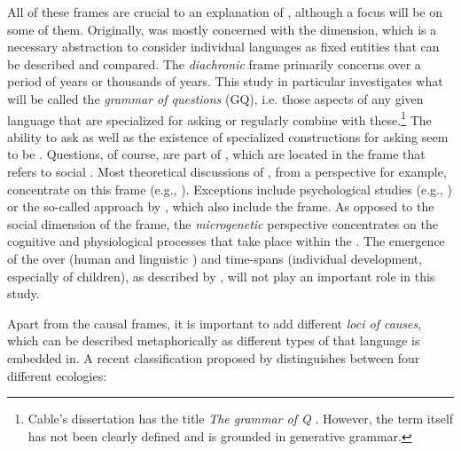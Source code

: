 All of these frames are crucial to an explanation of , although a focus will be on some of them. Originally,   was mostly concerned with the \textit{} dimension, which is a necessary abstraction to consider individual languages as fixed entities that can be described and compared. The \textit{diachronic} frame primarily concerns  over a period of years or thousands of years. This study in particular investigates what will be called the \textit{grammar of questions} (GQ), i.e. those aspects of any given language that are specialized for asking  or regularly combine with these.\footnote{Cable’s dissertation has the title \textit{The grammar of Q} \citep{Cable2007}. However, the term itself has not been clearly defined and is grounded in generative grammar.} The ability to ask  as well as the existence of specialized constructions for asking  seem to be . Questions, of course, are part of , which are located in the \textit{} frame that refers to social . Most theoretical discussions of , from a  perspective for example, concentrate on this frame (e.g., \citealt{Levinson2012b}). Exceptions include psychological studies (e.g., \citealt{Loewenstein1994}) or the so-called \textit{} approach by \citet{Schulze2007}, which also include the  frame. As opposed to the social dimension of the  frame, the \textit{microgenetic} perspective concentrates on the cognitive and physiological processes that take place within the . The emergence of the  over \textit{} (human and linguistic ) and \textit{} time-spans (individual development, especially of children), as described by \citet{Tomasello2008}, will not play an important role in this study.

Apart from the causal frames, it is important to add different \textit{loci of causes}, which can be described metaphorically as different types of  that language is embedded in. A recent classification proposed by \citet[7]{SteffensenFill2014} distinguishes between four different ecologies:

